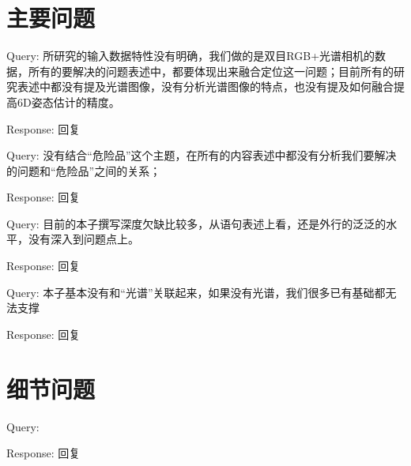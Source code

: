 \documentclass[12pt]{article}
\newcommand{\query}[1]{\textcolor[rgb]{0,0.6,0}{Query: #1}}
\newcommand{\response}[1]{\textcolor[rgb]{0,0,0.6}{Response: #1}}
\begin{document}
\section{主要问题}

\query{所研究的输入数据特性没有明确，我们做的是双目RGB+光谱相机的数据，所有的要解决的问题表述中，都要体现出来融合定位这一问题；目前所有的研究表述中都没有提及光谱图像，没有分析光谱图像的特点，也没有提及如何融合提高6D姿态估计的精度。    }

\response{回复}

\query{没有结合“危险品”这个主题，在所有的内容表述中都没有分析我们要解决的问题和“危险品”之间的关系；}

\response{回复}

\query{目前的本子撰写深度欠缺比较多，从语句表述上看，还是外行的泛泛的水平，没有深入到问题点上。}

\response{回复}

\query{本子基本没有和“光谱”关联起来，如果没有光谱，我们很多已有基础都无法支撑 }

\response{回复}

\section{细节问题}

\query{ }

\response{回复}
\end{document}
